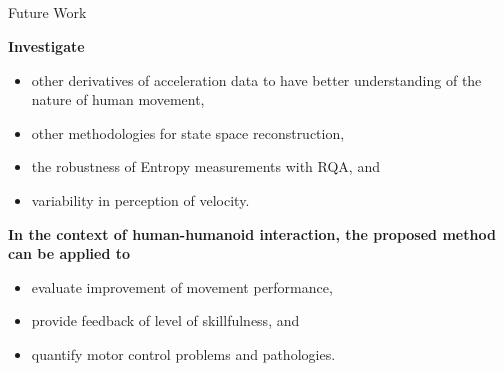 \subsection{}
{

\begin{frame}{Future Work}

\textbf{Investigate}
\begin{itemize}
	\item other derivatives of acceleration data
	to have better understanding of the nature of human movement,
	\item other methodologies for state space reconstruction,
	\item the robustness of Entropy measurements with RQA, and 
	\item variability in perception of velocity.
\end{itemize}

\textbf{In the context of human-humanoid interaction,
the proposed method can be applied to} 
\begin{itemize}
	\item evaluate improvement of movement performance,
	\item provide feedback of level of skillfulness, and 
	\item quantify motor control problems and pathologies.
\end{itemize}


\end{frame}
}




